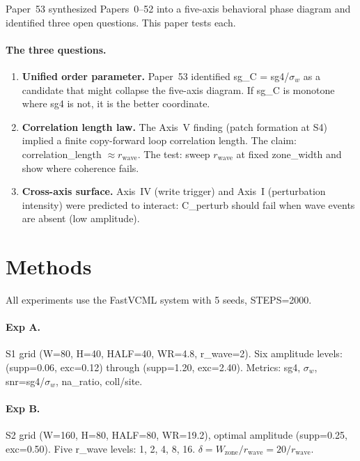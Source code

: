 \documentclass[11pt,a4paper]{article}
\begin{document}
Paper~53 synthesized Papers~0--52 into a five-axis behavioral phase diagram
and identified three open questions.
This paper tests each.

\paragraph{The three questions.}
\begin{enumerate}
  \item \textbf{Unified order parameter.}
    Paper~53 identified sg\_C = sg4/$\sigma_w$ as a candidate that might
    collapse the five-axis diagram.
    If sg\_C is monotone where sg4 is not, it is the better coordinate.

  \item \textbf{Correlation length law.}
    The Axis~V finding (patch formation at S4) implied a finite copy-forward
    loop correlation length.
    The claim: correlation\_length $\approx r_\text{wave}$.
    The test: sweep $r_\text{wave}$ at fixed zone\_width and show where coherence fails.

  \item \textbf{Cross-axis surface.}
    Axis~IV (write trigger) and Axis~I (perturbation intensity) were predicted
    to interact: C\_perturb should fail when wave events are absent (low
    amplitude).
\end{enumerate}

\section{Methods}

All experiments use the FastVCML system with 5 seeds, STEPS=2000.

\paragraph{Exp A.}
S1 grid (W=80, H=40, HALF=40, WR=4.8, r\_wave=2).
Six amplitude levels: (supp=0.06, exc=0.12) through (supp=1.20, exc=2.40).
Metrics: sg4, $\sigma_w$, snr=sg4/$\sigma_w$, na\_ratio, coll/site.

\paragraph{Exp B.}
S2 grid (W=160, H=80, HALF=80, WR=19.2), optimal amplitude (supp=0.25, exc=0.50).
Five r\_wave levels: 1, 2, 4, 8, 16.
$\delta = W_\text{zone}/r_\text{wave} = 20/r_\text{wave}$.
\end{document}
